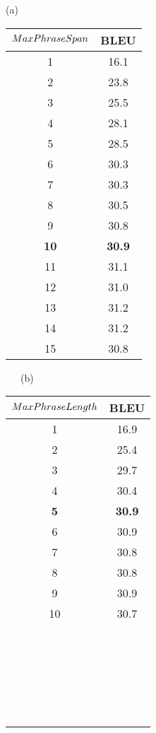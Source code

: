 	(a) \begin{tabular}{cc}
		$MaxPhraseSpan$ & BLEU \\ \hline
		1 & 16.1 \\
		2 & 23.8 \\
		3 & 25.5 \\
		4 & 28.1 \\
		5 & 28.5 \\
		6 & 30.3 \\
		7 & 30.3 \\
		8 & 30.5 \\
		9 & 30.8 \\
		\bf{10} & \bf{30.9} \\
		11 & 31.1 \\
		12 & 31.0 \\
		13 & 31.2 \\
		14 & 31.2 \\
		15 & 30.8 \\
	\end{tabular}
	~~~(b) \begin{tabular}{cc} 
		$MaxPhraseLength$ & BLEU \\ \hline
		1 & 16.9 \\
		2 & 25.4 \\
		3 & 29.7 \\
		4 & 30.4 \\
		\bf{5} & \bf{30.9} \\
		6 & 30.9 \\
		7 & 30.8 \\
		8 & 30.8 \\
		9 & 30.9 \\
		10 & 30.7 \\
		~\\
		~\\
		~\\
		~\\
		~\\
	\end{tabular}

